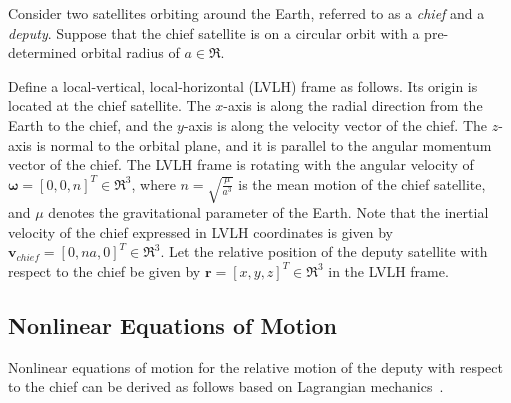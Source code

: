 Consider two satellites orbiting around the Earth, referred to as a \textit{chief} and a \textit{deputy}. Suppose that the chief satellite is on a circular orbit with a pre-determined orbital radius of $a\in\Re$.

Define a local-vertical, local-horizontal (LVLH) frame as follows. Its origin is located at the chief satellite. The $x$-axis is along the radial direction from the Earth to the chief, and the $y$-axis is along the velocity vector of the chief. The $z$-axis is normal to the orbital plane, and it is parallel to the angular momentum vector of the chief. The LVLH frame is rotating with the angular velocity of $\mathbf{\omega}=[0,0,n]^T\in\Re^3$, where $n=\sqrt{\frac{\mu}{a^3}}$ is the mean motion of the chief satellite, and $\mu$ denotes the gravitational parameter of the Earth. Note that the inertial velocity of the chief expressed in LVLH coordinates is given by $\mathbf{v}_{chief}=[0,na,0]^T\in\Re^3$. Let the relative position of the deputy satellite with respect to the chief be given by $\mathbf{r}=[x,y,z]^T\in\Re^3$ in the LVLH frame. 

\subsection{Nonlinear Equations of Motion}

Nonlinear equations of motion for the relative motion of the deputy with respect to the chief can be derived as follows based on Lagrangian mechanics~\cite{LovLeePISSFD14}. 

